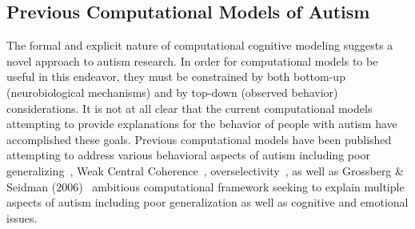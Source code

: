 


\subsection{Previous Computational Models of Autism}

The formal and explicit nature of computational cognitive modeling suggests a novel approach to autism research.  In order for computational models to be useful in this endeavor, they must be constrained by both bottom-up (neurobiological mechanisms) and by top-down (observed behavior) considerations.  It is not at all clear that the current computational models attempting to provide explanations for the behavior of people with autism have accomplished these goals.  Previous computational models have been published attempting to address various behavioral aspects of autism including poor generalizing~\cite{CohenIL:1994:AutismLearning,GustafssonL:1997:AutismMaps}, Weak Central Coherence~\cite{OLoughlinC:2000:Coherence}, overselectivity~\cite{McClellandJL:2000:Autism}, as well as Grossberg \& Seidman (2006)~\nocite{RefWorks:146} ambitious computational framework seeking to explain multiple aspects of autism including poor generalization as well as cognitive and emotional issues.

